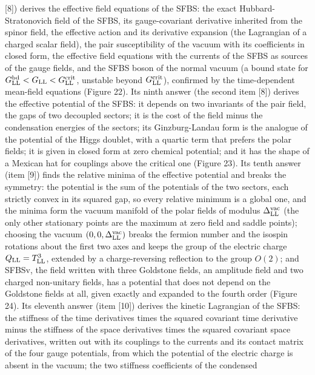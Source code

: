 \documentclass[
  10pt,
]{article}
\begin{document}
{[}8{]}) derives the effective field equations of the SFBS: the exact
Hubbard-Stratonovich field of the SFBS, its gauge-covariant derivative
inherited from the spinor field, the effective action and its derivative
expansion (the Lagrangian of a charged scalar field), the pair
susceptibility of the vacuum with its coefficients in closed form, the
effective field equations with the currents of the SFBS as sources of
the gauge fields, and the SFBS boson of the normal vacuum (a bound state
for \(G^{\rm bd}_{\rm LL}<G_{\rm LL}<G^{\rm crit}_{\rm LL}\), unstable
beyond \(G^{\rm crit}_{\rm LL}\)), confirmed by the time-dependent
mean-field equations (Figure 22). Its ninth answer (the second item
{[}8{]}) derives the effective potential of the SFBS: it depends on two
invariants of the pair field, the gaps of two decoupled sectors; it is
the cost of the field minus the condensation energies of the sectors;
its Ginzburg-Landau form is the analogue of the potential of the Higgs
doublet, with a quartic term that prefers the polar fields; it is given
in closed form at zero chemical potential; and it has the shape of a
Mexican hat for couplings above the critical one (Figure 23). Its tenth
answer (item {[}9{]}) finds the relative minima of the effective
potential and breaks the symmetry: the potential is the sum of the
potentials of the two sectors, each strictly convex in its squared gap,
so every relative minimum is a global one, and the minima form the
vacuum manifold of the polar fields of modulus
\(\Delta^{\rm vac}_{\rm LL}\) (the only other stationary points are the
maximum at zero field and saddle points); choosing the vacuum
\((0,0,\Delta^{\rm vac}_{\rm LL})\) breaks the fermion number and the
isospin rotations about the first two axes and keeps the group of the
electric charge \(Q_{\rm LL}=T^3_{\rm LL}\), extended by a
charge-reversing reflection to the group \(O(2)\); and SFBSv, the field
written with three Goldstone fields, an amplitude field and two charged
non-unitary fields, has a potential that does not depend on the
Goldstone fields at all, given exactly and expanded to the fourth order
(Figure 24). Its eleventh answer (item {[}10{]}) derives the kinetic
Lagrangian of the SFBS: the stiffness of the time derivatives times the
squared covariant time derivative minus the stiffness of the space
derivatives times the squared covariant space derivatives, written out
with its couplings to the currents and its contact matrix of the four
gauge potentials, from which the potential of the electric charge is
absent in the vacuum; the two stiffness coefficients of the condensed
\end{document}
